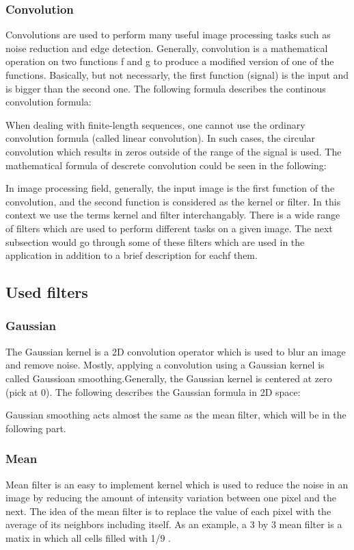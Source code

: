 \documentclass{article}
\begin{document}
		\subsubsection{Convolution}

			Convolutions are used to perform many useful image processing tasks such as noise reduction and edge detection. Generally,
			convolution is a mathematical operation on two functions f and g to produce a modified version of one of the functions.
			Basically, but not necessarly, the first function (signal) is the input and is bigger than the second one.
			The following formula describes the continous convolution formula:
			
			
			When dealing with finite-length sequences, one cannot use the ordinary convolution formula (called linear convolution).
			In such cases, the circular convolution which results in zeros outside of the range of the signal is used. The mathematical formula of descrete 
			convolution could be seen in the following:
			
			In image processing field, generally, the input image is the first function of the convolution, and the second 
			function is considered as the kernel or filter.
			In this context we use the terms kernel and filter interchangably.
			There is a wide range of filters which are used to perform different tasks on a given image. The next subsection would go through some of these 
			filters which are used in the application in addition to a brief description for eachf them.

		\subsection{Used filters}
		
		\subsubsection{Gaussian}

			The Gaussian kernel is a 2D convolution operator which is used to blur an image and remove noise. Mostly, applying a convolution using a Gaussian
			kernel is called Gaussioan smoothing.Generally, the Gaussian kernel is centered at
			zero (pick at 0). The following describes the Gaussian formula in 2D space:
			
			Gaussian smoothing acts almost the same as the mean filter, which will be in the following part.
		\subsubsection{Mean}
			Mean filter is an easy to implement kernel which is used to reduce the noise in an image by reducing the amount of intensity variation between one
			pixel and the next. The idea of the mean filter is to replace the value of each pixel with the average of its neighbors including itself. As an example,
			a 3 by 3 mean filter is a matix in which all cells filled with 1/9 .	
		
\end{document}
